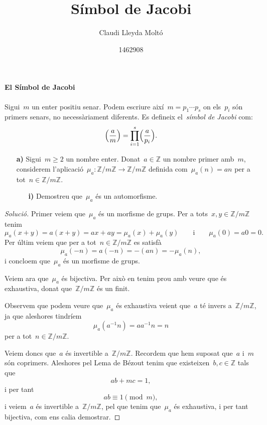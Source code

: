 \documentclass[a4paper]{article}
\title{Símbol de Jacobi}
\author{Claudi Lleyda Moltó}
\date{1462908}
\newcommand{\ZZ}{\mathbb{Z}}
\newenvironment{solution}{
    \renewcommand\qedsymbol{\ensuremath{\lozenge}}
    \begin{proof}[Solució]
        }{
    \end{proof}
}
\begin{document}
\maketitle

\paragraph{El Símbol de Jacobi} Sigui~\(m\) un enter positiu senar.
Podem escriure així~\(m=p_{1}\cdots p_{s}\) on els~\(p_{i}\) són primers senars,
no necessàriament diferents.
Es defineix el~\emph{símbol de Jacobi} com:
\[
    \Bigl(\frac{a}{m}\Bigr)
    =
    \prod_{i=1}^{s}
    \Bigl(\frac{a}{p_{i}}\Bigr).
\]

\begin{enumerate}
    \item[\textbf{a)}] Sigui~\(m\geq2\) un nombre enter.
        Donat~\(a\in\ZZ\) un nombre primer amb~\(m\),
        considerem l'aplicació~\(\mu_{a}:\ZZ/m\ZZ\longrightarrow\ZZ/m\ZZ\)
        definida com~\(\mu_{a}(n)=an\) per a tot~\(n\in\ZZ/m\ZZ\).
        \begin{enumerate}
            \item[\textbf{i)}] Demostreu que~\(\mu_{a}\) és un automorfisme.
        \end{enumerate}
\end{enumerate}

\begin{solution}
Primer veiem que~\(\mu_{a}\) és un morfisme de grups.
Per a tots~\(x,y\in\ZZ/m\ZZ\) tenim
\[
    \mu_{a}(x+y) = a(x+y) = ax + ay = \mu_{a}(x) + \mu_{a}(y)
    \qquad
    \text{i}
    \qquad
    \mu_{a}(0) = a0 = 0.
\]
Per últim veiem que per a tot~\(n\in\ZZ/m\ZZ\) es satisfà
\[
    \mu_{a}(-n) = a(-n) = -(an) = -\mu_{a}(n),
\]
i concloem que~\(\mu_{a}\) és un morfisme de grups.

Veiem ara que~\(\mu_{a}\) és bijectiva.
Per això en tenim prou amb veure que és exhaustiva,
donat que~\(\ZZ/m\ZZ\) és un finit.

Observem que podem veure que~\(\mu_{a}\) és exhaustiva veient que~\(a\) té
invers a~\(\ZZ/m\ZZ\),
ja que aleshores tindríem
\[
    \mu_{a}(a^{-1}n) = aa^{-1}n = n
\]
per a tot~\(n\in\ZZ/m\ZZ\).

Veiem doncs que~\(a\) és invertible a~\(\ZZ/m\ZZ\).
Recordem que hem suposat que~\(a\) i~\(m\) són coprimers.
Aleshores pel Lema de Bézout tenim que existeixen~\(b,c\in\ZZ\) tals que
\[
    ab + mc = 1,
\]
i per tant
\[
    ab \equiv 1 \pmod{m},
\]
i veiem~\(a\) és invertible a~\(\ZZ/m\ZZ\),
pel que tenim que~\(\mu_{a}\) és exhaustiva,
i per tant bijectiva,
com ens calia demostrar.
\end{solution}
\end{document}

